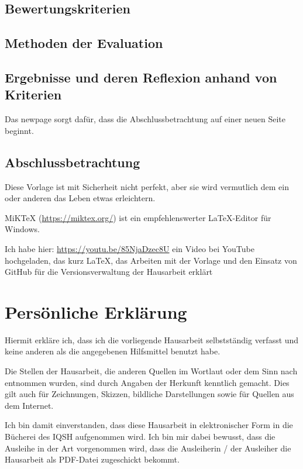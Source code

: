 \documentclass[a4paper, 12pt]{article}
\begin{document}
\subsection{Bewertungskriterien}
\subsection{Methoden der Evaluation}
\subsection{Ergebnisse und deren Reflexion anhand von Kriterien}
Das newpage sorgt dafür, dass die Abschlussbetrachtung auf einer neuen Seite beginnt.
\newpage
\subsection{Abschlussbetrachtung}
Diese Vorlage ist mit Sicherheit nicht perfekt, aber sie wird vermutlich dem ein oder anderen das Leben etwas erleichtern.

MiKTeX (\href{https://miktex.org/}{https://miktex.org/}) ist ein empfehlenswerter \LaTeX{}-Editor für Windows.

Ich habe hier: \href{https://youtu.be/85NjaDzec8U}{https://youtu.be/85NjaDzec8U} ein Video bei YouTube hochgeladen, das kurz \LaTeX{}, das Arbeiten mit der Vorlage und den Einsatz von GitHub für die Versionsverwaltung der Hausarbeit erklärt 


\newpage
\thispagestyle{empty}



\newpage
\thispagestyle{empty}
\section*{Persönliche Erklärung}

Hiermit erkläre ich, dass ich die vorliegende Hausarbeit selbstständig verfasst und keine anderen als die angegebenen Hilfsmittel benutzt habe.

Die Stellen der Hausarbeit, die anderen Quellen im Wortlaut oder dem Sinn nach entnommen wurden, sind durch Angaben der Herkunft kenntlich gemacht. Dies gilt auch für Zeichnungen, Skizzen, bildliche Darstellungen sowie für Quellen aus dem Internet.

Ich bin damit einverstanden, dass diese Hausarbeit in elektronischer Form in die Bücherei des IQSH aufgenommen wird. Ich bin mir dabei bewusst, dass die Ausleihe in der Art vorgenommen wird, dass die Ausleiherin / der Ausleiher die Hausarbeit als PDF-Datei zugeschickt bekommt.
\end{document}
